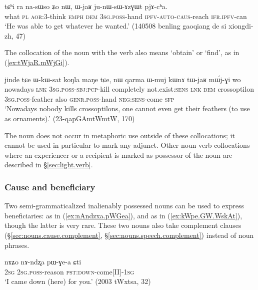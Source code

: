 \begin{exe}
\ex \label{ex:WjaR.junWsAzGWt}
\gll tɕʰi ra na-sɯso ʑo nɯ, ɯ-jaʁ ju-nɯ-sɯ-ɤzɣɯt pjɤ-cʰa.  \\
what \textsc{pl} \textsc{aor}:3\flobv{}-think \textsc{emph} \textsc{dem} \textsc{3sg}.\textsc{poss}-hand \textsc{ipfv}-\textsc{auto}-\textsc{caus}-reach \textsc{ifr}.\textsc{ipfv}-can \\
\glt  `He was able to get whatever he wanted.' (140508 benling gaoqiang de si xiongdi-zh, 47)
\end{exe}

The collocation of the noun  with the verb  also means `obtain' or `find', as in (\ref{ex:tWjaR.mWjGi}).

\begin{exe}
\ex \label{ex:tWjaR.mWjGi}
\gll jinde tɕe ɯ-kɯ-sat koŋla maŋe tɕe, nɯ qarma ɯ-muj kɯnɤ tɯ-jaʁ mɯ́j-ɣi wo\\
nowadays \textsc{lnk} \textsc{3sg}.\textsc{poss}-\textsc{sbj}:\textsc{pcp}-kill completely not.exist:\textsc{sens} \textsc{lnk} \textsc{dem} crossoptilon \textsc{3sg}.\textsc{poss}-feather also \textsc{genr}.\textsc{poss}-hand \textsc{neg}:\textsc{sens}-come \textsc{sfp}\\
\glt `Nowadays nobody kills crossoptilons, one cannot even get their feathers (to use as ornaments).' (23-qapGAmtWmtW, 170)
\end{exe}

The noun  does not occur in metaphoric use outside of these collocations; it cannot be used in particular to mark any adjunct. Other noun-verb collocations where an experiencer or a recipient is marked as possessor of the noun are described in §\ref{sec:light.verb}.


\subsubsection{Cause and beneficiary} \label{sec:IPN.cause}
Two semi-grammaticalized inalienably possessed nouns can be used to express beneficiaries:  as in (\ref{ex:nAndzxa.pWGea}), and  as in (\ref{ex:kWpe.GW.WskAt}), though the latter is very rare. These two nouns also take complement clauses (§\ref{sec:nouns.cause.complement}, §\ref{sec:nouns.speech.complement}) instead of noun phrases.

\begin{exe}
\ex \label{ex:nAndzxa.pWGea}
\gll nɤʑo nɤ-ndʐa pɯ-ɣe-a ɕti \\
\textsc{2sg} \textsc{2sg}.\textsc{poss}-reason \textsc{pst}:\textsc{down}-come[II]-\textsc{1sg} \\
\glt `I came down (here) for you.' (2003 tWxtsa, 32)
\end{exe}

